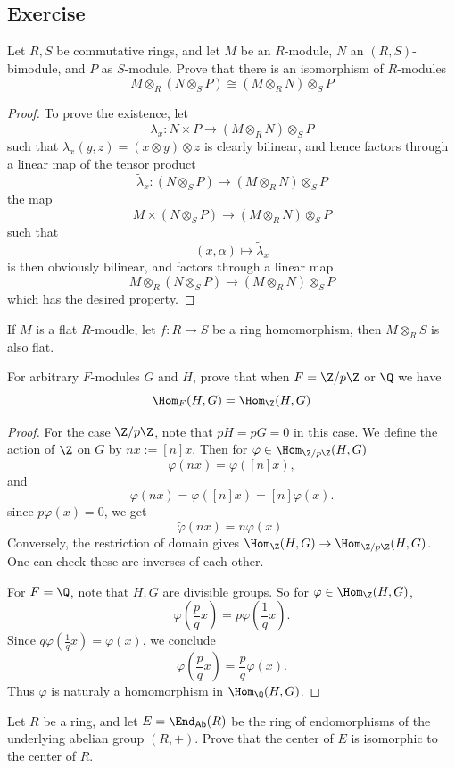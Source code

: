 \subsection{Exercise}
\begin{exercise}
Let $R,S$ be commutative rings, and let $M$ be an $R$-module, $N$ an $(R,S)$-bimodule, and $P$ as $S$-module. Prove that there is an isomorphism of $R$-modules
\[M\otimes_{R}(N\otimes_{S}P)\cong(M\otimes_{R}N)\otimes_{S}P\]
\end{exercise}
\begin{proof}
To prove the existence, let
\[\lambda_x:N\times P\to (M\otimes_{R} N)\otimes_{S}P\]
such that $\lambda_x(y,z)=(x\otimes y)\otimes z$ is clearly bilinear, and hence factors through a
linear map of the tensor product
\[\widetilde{\lambda}_x:(N\otimes_{S}P)\to(M\otimes_{R} N)\otimes_{S}P\]
the map
\[M\times(N\otimes_{S}P)\to(M\otimes_{R} N)\otimes_{S}P\]
such that
\[(x,\alpha)\mapsto\widetilde{\lambda}_x\]
is then obviously bilinear, and factors through a linear map
\[M\otimes_{R}(N\otimes_{S}P)\to(M\otimes_{R}N)\otimes_{S}P\]
which has the desired property.
\end{proof}
\begin{corollary}
If $M$ is a flat $R$-moudle, let $f:R\to S$ be a ring homomorphism, then $M\otimes_RS$ is also flat.
\end{corollary}
\begin{exercise}
For arbitrary $F$-modules $G$ and $H$, prove that when $F=\Z/p\Z$ or $\Q$ we have \[\Hom_F(H,G)=\Hom_\Z(H,G)\]
\end{exercise}
\begin{proof}
For the case $\Z/p\Z$, note that $pH=pG=0$ in this case. We define the action of $\Z$ on $G$ by $nx:=[n]x$. Then for $\varphi\in\Hom_{\Z/p\Z}(H,G)$
\[\varphi(nx)=\varphi([n]x),\]
and
\[\varphi(nx)=\varphi([n]x)=[n]\varphi(x).\]
since $p\varphi(x)=0$, we get
\[\widetilde{\varphi}(nx)=n\varphi(x).\]
Conversely, the restriction of domain gives $\Hom_\Z(H,G)\to\Hom_{\Z/p\Z}(H,G)$. One can check these are inverses of each other.\par
For $F=\Q$, note that $H,G$ are divisible groups. So for $\varphi\in\Hom_{\Z}(H,G)$,
\[\varphi(\frac{p}{q}x)=p\varphi(\frac{1}{q}x).\]
Since $q\varphi(\frac{1}{q}x)=\varphi(x)$, we conclude
\[\varphi(\frac{p}{q}x)=\frac{p}{q}\varphi(x).\]
Thus $\varphi$ is naturaly a homomorphism in $\Hom_{\Q}(H,G)$.
\end{proof}
\begin{exercise}\label{center endo}
Let $R$ be a ring, and let $E=\End_{\mathsf{Ab}}(R)$ be the ring of endomorphisms of the underlying abelian group $(R,+)$. Prove that the center of $E$ is isomorphic to the center of $R$.
\end{exercise}
